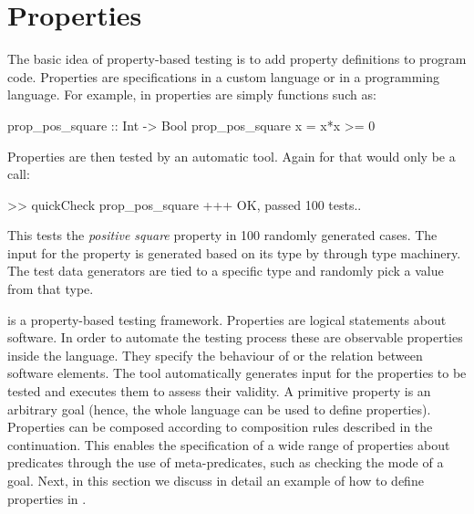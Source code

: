 

\section{Properties}
\label{sec:properties}

The basic idea of property-based testing is to add property definitions
to program code.
%
Properties are specifications in a custom language or in a programming
language.
%
For example, in \QuickCheck{} properties are simply \Haskell{} functions such as:
%
\begin{code}
 prop_pos_square :: Int -> Bool
 prop_pos_square x = x*x >= 0
\end{code}

Properties are then tested by an automatic tool.
%
Again for \Haskell{} \QuickCheck{} that would only be a call:
%
\begin{code}
 >> quickCheck prop_pos_square
 +++ OK, passed 100 tests..
\end{code}
%
This tests the \emph{positive square} property in 100 randomly
generated cases.
%
The input for the property is generated based on its type by
\QuickCheck{} through type machinery.
%
The test data generators are tied to a specific type and randomly pick a
value from that type.


\plqc{} is a property-based testing framework.
%
Properties are logical statements about software.
%
In order to automate the testing process these are observable properties
inside the language.
%
They specify the behaviour of or the relation between software
elements.
%
The tool automatically generates input for the properties to be tested
and executes them to assess their validity.
%
A primitive property is an arbitrary \Prolog{} goal (hence, the whole
language can be used to define properties).
%
Properties can be composed according to composition
rules described in the continuation.
%
%
%
%
This enables the specification of a wide range of properties about
predicates through the use of meta-predicates, such as checking
the mode of a goal. %
%
Next, in this section we discuss in detail an example of how to define
properties in \plqc{}.


